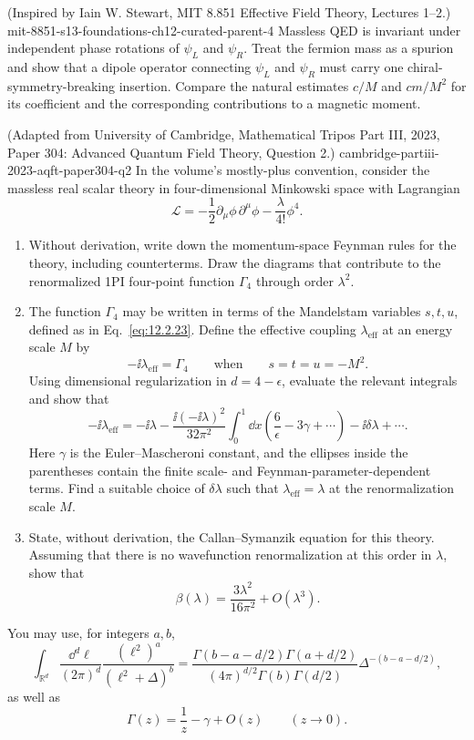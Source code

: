 \begin{enumerate}
  {(Inspired by Iain W. Stewart, MIT 8.851 Effective Field Theory, Lectures 1--2.)}
  {mit-8851-s13-foundations-ch12-curated-parent-4}
Massless QED is invariant under independent phase rotations of
\(\psi_L\) and \(\psi_R\).  Treat the fermion mass as a spurion and show
that a dipole operator connecting \(\psi_L\) and \(\psi_R\) must carry one
chiral-symmetry-breaking insertion.  Compare the natural estimates
\(c/M\) and \(cm/M^2\) for its coefficient and the corresponding
contributions to a magnetic moment.

  {(Adapted from University of Cambridge, Mathematical Tripos Part III, 2023, Paper 304: Advanced Quantum Field Theory, Question 2.)}
  {cambridge-partiii-2023-aqft-paper304-q2}
In the volume's mostly-plus convention, consider the massless real scalar
theory in four-dimensional Minkowski space with Lagrangian
\[
 \mathcal L=-\frac12\partial_\mu\phi\,\partial^\mu\phi
 -\frac{\lambda}{4!}\phi^4.
\]
\begin{enumerate}
\item
Without derivation, write down the momentum-space Feynman rules for the
theory, including counterterms.  Draw the diagrams that contribute to the
renormalized 1PI four-point function \(\Gamma_4\) through order
\(\lambda^2\).
\item
The function \(\Gamma_4\) may be written in terms of the Mandelstam
variables \(s,t,u\), defined as in Eq.~\eqref{eq:12.2.23}.  Define the
effective coupling \(\lambda_{\mathrm{eff}}\) at an energy scale \(M\) by
\[
 -\ii\lambda_{\mathrm{eff}}=\Gamma_4
 \qquad\text{when}\qquad s=t=u=-M^2.
\]
Using dimensional regularization in \(d=4-\epsilon\), evaluate the relevant
integrals and show that
\[
 -\ii\lambda_{\mathrm{eff}}
 =-\ii\lambda
 -\frac{\ii(-\ii\lambda)^2}{32\pi^2}\int_0^1\dd x
 \left(\frac6\epsilon-3\gamma+\cdots\right)
 -\ii\delta\lambda+\cdots.
\]
Here \(\gamma\) is the Euler--Mascheroni constant, and the ellipses inside
the parentheses contain the finite scale- and Feynman-parameter-dependent
terms.  Find a suitable choice of \(\delta\lambda\) such that
\(\lambda_{\mathrm{eff}}=\lambda\) at the renormalization scale \(M\).
\item
State, without derivation, the Callan--Symanzik equation for this theory.
Assuming that there is no wavefunction renormalization at this order in
\(\lambda\), show that
\[
 \beta(\lambda)=\frac{3\lambda^2}{16\pi^2}+O(\lambda^3).
\]
\end{enumerate}
You may use, for integers \(a,b\),
\[
 \int_{\mathbb R^d}\frac{\dd^d\ell}{(2\pi)^d}
 \frac{(\ell^2)^a}{(\ell^2+\Delta)^b}
 =\frac{\Gamma(b-a-d/2)\Gamma(a+d/2)}
 {(4\pi)^{d/2}\Gamma(b)\Gamma(d/2)}
 \Delta^{-(b-a-d/2)},
\]
as well as
\[
 \Gamma(z)=\frac1z-\gamma+O(z)
 \qquad (z\to0).
\]


\end{enumerate}
